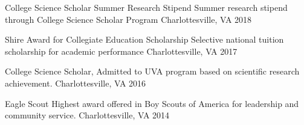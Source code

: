 \begin{cvhonors}
  \cvhonor
    { College Science Scholar Summer Research Stipend} %
    {Summer research stipend through College Science Scholar Program} %
    {Charlottesville, VA} %
    {2018} %
    
  \cvhonor
    {Shire Award for Collegiate Education Scholarship} %
    {Selective national tuition scholarship for academic performance} %
    {Charlottesville, VA} %
    {2017} %

  \cvhonor
    {College Science Scholar,} %
    {Admitted to UVA program based on scientific research achievement.} %
    {Charlottesville, VA} %
    {2016} %

    
  \cvhonor
    {Eagle Scout} %
    {Highest award offered in Boy Scouts of America for leadership and community service.} %
    {Charlottesville, VA} %
    {2014} %


\end{cvhonors}






